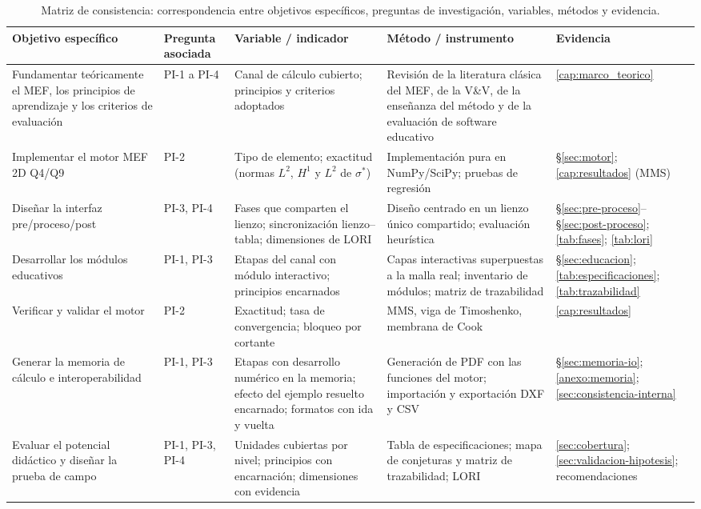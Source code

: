 \begin{table}[htbp]
\centering
\caption[Matriz de consistencia de la investigación.]{Matriz de consistencia: correspondencia entre objetivos específicos, preguntas de investigación, variables, métodos y evidencia.}
\label{tab:consistencia}
{\footnotesize
\setlength{\tabcolsep}{3pt}
\renewcommand{\arraystretch}{1.15}
\begin{tabular}{@{}>{\raggedright\arraybackslash}p{3.0cm}>{\raggedright\arraybackslash}p{1.6cm}>{\raggedright\arraybackslash}p{3.1cm}>{\raggedright\arraybackslash}p{3.3cm}>{\raggedright\arraybackslash}p{2.6cm}@{}}
\toprule
\textbf{Objetivo específico} & \textbf{Pregunta asociada} & \textbf{Variable / indicador} & \textbf{Método / instrumento} & \textbf{Evidencia} \\
\midrule
Fundamentar teóricamente el MEF, los principios de aprendizaje y los criterios de evaluación & PI-1 a PI-4 & Canal de cálculo cubierto; principios y criterios adoptados & Revisión de la literatura clásica del MEF, de la V\&V, de la enseñanza del método y de la evaluación de software educativo & \autoref{cap:marco_teorico} \\
Implementar el motor MEF 2D Q4/Q9 & PI-2 & Tipo de elemento; exactitud (normas $L^2$, $H^1$ y $L^2$ de $\sigma^*$) & Implementación pura en NumPy/SciPy; pruebas de regresión & \S\ref{sec:motor}; \autoref{cap:resultados} (MMS) \\
Diseñar la interfaz pre/proceso/post & PI-3, PI-4 & Fases que comparten el lienzo; sincronización lienzo--tabla; dimensiones de LORI & Diseño centrado en un lienzo único compartido; evaluación heurística & \S\ref{sec:pre-proceso}--\S\ref{sec:post-proceso}; \autoref{tab:fases}; \autoref{tab:lori} \\
Desarrollar los módulos educativos & PI-1, PI-3 & Etapas del canal con módulo interactivo; principios encarnados & Capas interactivas superpuestas a la malla real; inventario de módulos; matriz de trazabilidad & \S\ref{sec:educacion}; \autoref{tab:especificaciones}; \autoref{tab:trazabilidad} \\
Verificar y validar el motor & PI-2 & Exactitud; tasa de convergencia; bloqueo por cortante & MMS, viga de Timoshenko, membrana de Cook & \autoref{cap:resultados} \\
Generar la memoria de cálculo e interoperabilidad & PI-1, PI-3 & Etapas con desarrollo numérico en la memoria; efecto del ejemplo resuelto encarnado; formatos con ida y vuelta & Generación de PDF con las funciones del motor; importación y exportación DXF y CSV & \S\ref{sec:memoria-io}; \autoref{anexo:memoria}; \autoref{sec:consistencia-interna} \\
Evaluar el potencial didáctico y diseñar la prueba de campo & PI-1, PI-3, PI-4 & Unidades cubiertas por nivel; principios con encarnación; dimensiones con evidencia & Tabla de especificaciones; mapa de conjeturas y matriz de trazabilidad; LORI & \autoref{sec:cobertura}; \autoref{sec:validacion-hipotesis}; recomendaciones \\
\bottomrule
\end{tabular}}
\end{table}

